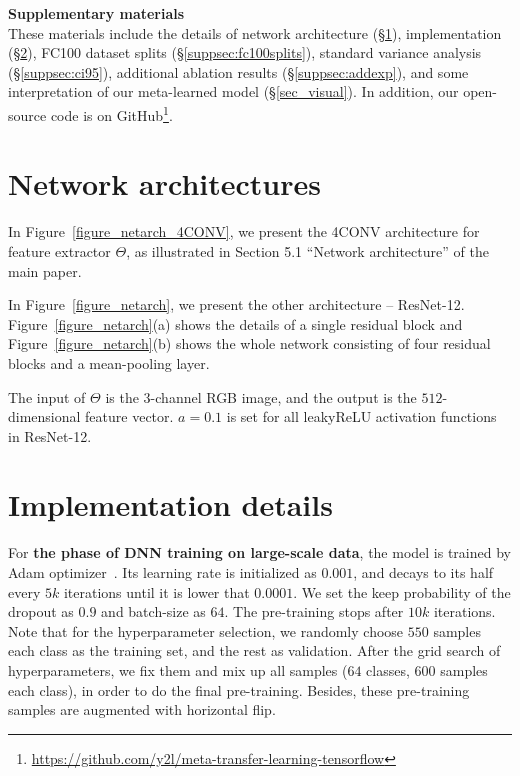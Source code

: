 
\beginsupp
\setcounter{section}{0}
\renewcommand\thesection{\Alph{section}}
\noindent
{\Large {\textbf{Supplementary materials}}}
\\

These materials include the details of network architecture (\S\ref{suppsec:arch}), implementation (\S\ref{suppsec:implementation}), FC100 dataset splits (\S\ref{suppsec:fc100splits}), standard variance analysis (\S\ref{suppsec:ci95}), additional ablation results (\S\ref{suppsec:addexp}), and some interpretation of our meta-learned model (\S\ref{sec_visual}).
In addition, our open-source code is on GitHub\footnote{\href{https://github.com/y2l/meta-transfer-learning-tensorflow}{https://github.com/y2l/meta-transfer-learning-tensorflow}}.



\section{Network architectures}
\label{suppsec:arch}
In Figure~\ref{figure_netarch_4CONV}, we present the 4CONV architecture for feature extractor $\Theta$, as illustrated in Section 5.1 ``Network architecture'' of the main paper.
%
%

In Figure~\ref{figure_netarch}, we present the other architecture -- ResNet-12.
%
Figure~\ref{figure_netarch}(a) shows the details of a single residual block and Figure~\ref{figure_netarch}(b) shows the whole network consisting of four residual blocks and a mean-pooling layer. 


The input of $\Theta$ is the $3$-channel RGB image, and the output is the $512$-dimensional feature vector. 
$a = 0.1$ is set for all leakyReLU activation functions in ResNet-12.


\section{Implementation details}
\label{suppsec:implementation}
For \textbf{the phase of DNN training on large-scale data}, the model is trained by Adam optimizer~\cite{kingma2014adam}. Its learning rate is initialized as $0.001$, and decays to its half every $5k$ iterations until it is lower that $0.0001$. 
We set the keep probability of the dropout as $0.9$ and batch-size as $64$.
The pre-training stops after $10k$ iterations.
%
%
Note that for the hyperparameter selection, we randomly choose $550$ samples each class as the training set, and the rest as validation. 
After the grid search of hyperparameters, we fix them and mix up all samples ($64$ classes, $600$ samples each class), in order to do the final pre-training.
Besides, these pre-training samples are augmented with horizontal flip.



